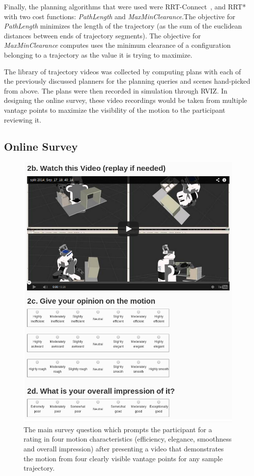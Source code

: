 \documentclass[letterpaper, 10 pt, conference]{ieeeconf}  %
\begin{document}
Finally, the planning algorithms that were used were RRT-Connect~\cite{kuffner2000rrt}, and RRT*~\cite{frazzoli-RRTstar} with two cost functions: \emph{PathLength} and \emph{MaxMinClearance}.The objective for \emph{PathLength} minimizes the length of the trajectory (as the sum of the euclidean distances between ends of trajectory segments). The objective for \emph{MaxMinClearance} computes uses the minimum clearance of a configuration belonging to a trajectory as the value it is trying to maximize.

The library of trajectory videos was collected by computing plans with each of the previously discussed planners for the planning queries and scenes hand-picked from above. The plans were then recorded in simulation through RVIZ. In designing the online survey, these video recordings would be taken from multiple vantage points to maximize the visibility of the motion to the participant reviewing it.

\subsection{Online Survey}

\begin{figure}
    \includegraphics[trim = 0mm 0mm 0mm 0mm, width=\columnwidth]{pictures/amazon_survey_screenshot}
    \caption{The main survey question which prompts the participant for a rating in four motion characteristics (efficiency, elegance, smoothness and overall impression) after presenting a video that demonstrates the motion from four clearly visible vantage points for any sample trajectory.}
    \label{fig:survey_question}
\end{figure}
\end{document}
